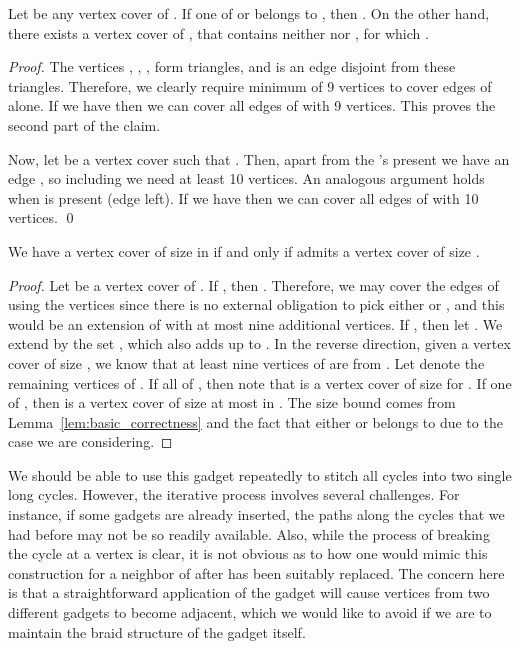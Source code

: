 \documentclass[svgnames]{llncs}
\begin{document}
{\begin{lemma}
\label{lem:basic_correctness}
Let  be any vertex cover of . If one of  or  belongs to , then . On the other hand, there exists a vertex cover   of , that contains neither  nor , for which . 
\label{W1vc}
\end{lemma}
\begin{proof}
The vertices , , ,  form triangles, and  is an edge disjoint from these triangles. 
Therefore, we clearly require minimum of 9 vertices to cover edges of  alone. If we have  then we can cover all edges of  with 9 vertices. 
This proves the second part of the claim. 

Now, let  be a vertex cover such that . Then, apart from the 's present we have an edge , so including  we need at least 10 vertices. 
An analogous argument holds when  is present (edge  left).
If we have  then we can cover all edges of  with 10 vertices.
\qed
\end{proof}



\begin{corollary}We have a vertex cover of size  in  if and only if  admits a vertex cover of size . 
\end{corollary}


\begin{proof}
Let  be a vertex cover of . If , then . Therefore, we may cover the edges of  using the vertices  since 
there is no external obligation to pick either  or , and this would be an extension of  with at most nine additional vertices. If , then let . We extend  by 
the set , which also adds up to . In the reverse direction, given a vertex cover of size , we know that at least nine vertices of  are from .  
Let  denote the remaining vertices of . If all of , then note that  is a vertex cover of size  for . If one of , 
then  is a vertex cover of size at most  in . The size bound comes from Lemma~\ref{lem:basic_correctness} and the fact that either  or  
belongs to  due to the case we are considering. 
\end{proof}



We should be able to use this gadget repeatedly to stitch all cycles into two single long cycles. However, the iterative process involves several challenges. For instance, if some gadgets are already inserted, 
the paths along the cycles that we had before may not be so readily available. Also, while the process of breaking the cycle at a vertex  is clear, it is not obvious as to how one would mimic this 
construction for a neighbor of  after  has been suitably replaced. The concern here is that a straightforward application of the gadget will cause vertices from two different gadgets
to become adjacent, which we would like to avoid if we are to maintain the braid structure of the gadget itself. 

}
\end{document}
